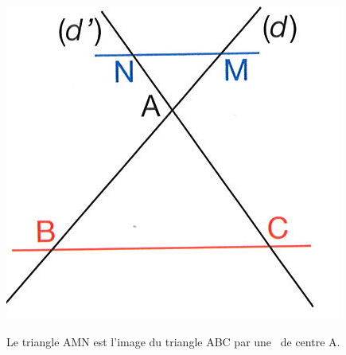 \documentclass[12pt,a4paper]{article}
\begin{document}
\begin{myprop}
\begin{multicols}{3}
		\includegraphics[scale=0.4]{./img/thales1}
	\end{multicols}
	
	Le triangle AMN est l'image du triangle ABC par une \homo\ de centre A.
\end{myprop}
\end{document}
